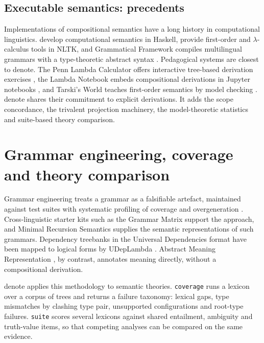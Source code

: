 \documentclass[11pt,a4paper]{article}
\newcommand{\dn}{\textsf{denote}}
\theoremstyle{definition}
\begin{document}
\subsection{Executable semantics: precedents}
Implementations of compositional semantics have a long history in computational linguistics. \citet{vaneijckunger2010} develop computational semantics in Haskell, \citet[ch.~10]{birdetal2009} provide first-order and $\lambda$-calculus tools in NLTK, and Grammatical Framework compiles multilingual grammars with a type-theoretic abstract syntax \citep{ranta2011}. Pedagogical systems are closest to \dn{}. The Penn Lambda Calculator offers interactive tree-based derivation exercises \citep{champollionetal2007}, the Lambda Notebook embeds compositional derivations in Jupyter notebooks \citep{rawlins2014}, and Tarski's World teaches first-order semantics by model checking \citep{barkerplummeretal2011}. \dn{} shares their commitment to explicit derivations. It adds the scope concordance, the trivalent projection machinery, the model-theoretic statistics and suite-based theory comparison.

\section{Grammar engineering, coverage and theory comparison}\label{sec:engineering}

Grammar engineering treats a grammar as a falsifiable artefact, maintained against test suites with systematic profiling of coverage and overgeneration \citep{oepenflickinger1998}. Cross-linguistic starter kits such as the Grammar Matrix \citep{benderetal2002} support the approach, and Minimal Recursion Semantics \citep{copestakeetal2005} supplies the semantic representations of such grammars. Dependency treebanks in the Universal Dependencies format \citep{demarneffeetal2021} have been mapped to logical forms by UDepLambda \citep{reddyetal2017}. Abstract Meaning Representation \citep{banarescuetal2013}, by contrast, annotates meaning directly, without a compositional derivation.

\dn{} applies this methodology to semantic theories. \texttt{coverage} runs a lexicon over a corpus of trees and returns a failure taxonomy: lexical gaps, type mismatches by clashing type pair, unsupported configurations and root-type failures. \texttt{suite} scores several lexicons against shared entailment, ambiguity and truth-value items, so that competing analyses can be compared on the same evidence.
\end{document}
